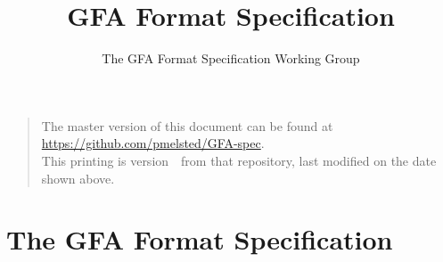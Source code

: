 \documentclass[10pt]{article}
\begin{document}

\title{GFA Format Specification}
\author{The GFA Format Specification Working Group}
\date{\headdate}
\maketitle
\begin{quote}\small
The master version of this document can be found at
\url{https://github.com/pmelsted/GFA-spec}.\\
This printing is version~\commitdesc\ from that repository,
last modified on the date shown above.
\end{quote}
\vspace*{1em}


\section{The GFA Format Specification}
\end{document}
